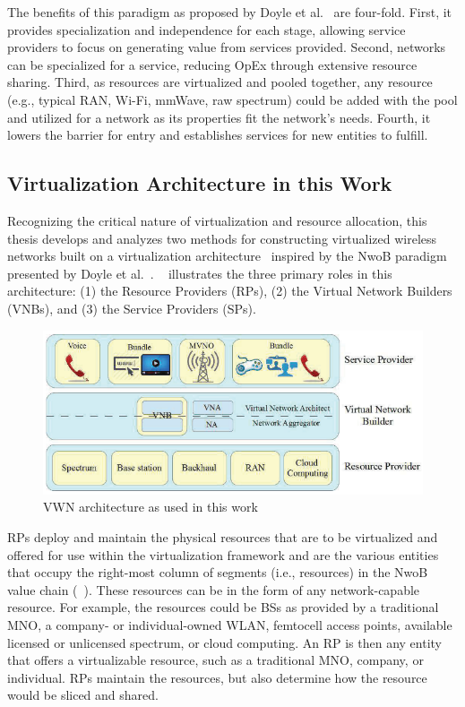 \documentclass[12pt,dvipsnames]{report}
\begin{document}
The benefits of this paradigm as proposed by Doyle et al.~\cite{6737248} are four-fold.  First, it provides specialization and independence for each stage, allowing service providers to focus on generating value from services provided.  Second, networks can be specialized for a service, reducing OpEx through extensive resource sharing.  Third, as resources are virtualized and pooled together, any resource (e.g., typical RAN, Wi-Fi, mmWave, raw spectrum) could be added with the pool and utilized for a network as its properties fit the network's needs.  Fourth, it lowers the barrier for entry and establishes services for new entities to fulfill.

\subsection{Virtualization Architecture in this Work} \label{subsec:virtualization_architecture}

Recognizing the critical nature of virtualization and resource allocation, this thesis develops and analyzes two methods for constructing virtualized wireless networks built on a virtualization architecture~\cite{MJ_CCNC_16, MJ_MECOMM_17} inspired by the NwoB paradigm presented by Doyle et al.~\cite{6737248}.  ~\cite{MJ_CCNC_16, MJ_MECOMM_17} illustrates the three primary roles in this architecture: (1) the Resource Providers (RPs), (2) the Virtual Network Builders (VNBs), and (3) the Service Providers (SPs).

\begin{figure}[ht]
	\centering
	\includegraphics[width=1\linewidth]{VWNArchitecture}
	\caption[VWN architecture as used in this work]{VWN architecture as used in this work~\cite{MJ_CCNC_16, MJ_MECOMM_17}}
	\label{fig:VWNArchitecture}
\end{figure}

RPs deploy and maintain the physical resources that are to be virtualized and offered for use within the virtualization framework and are the various entities that occupy the right-most column of segments (i.e., resources) in the NwoB value chain (~\cite{6737248}).  These resources can be in the form of any network-capable resource.  For example, the resources could be BSs as provided by a traditional MNO, a company- or individual-owned WLAN, femtocell access points, available licensed or unlicensed spectrum, or cloud computing.  An RP is then any entity that offers a virtualizable resource, such as a traditional MNO, company, or individual.  RPs maintain the resources, but also determine how the resource would be sliced and shared.
\end{document}
